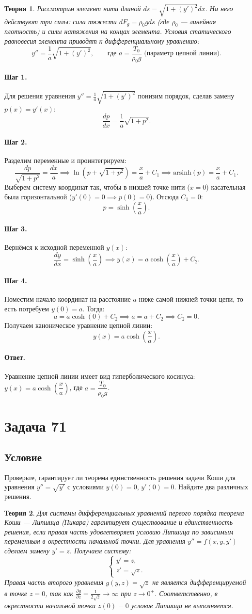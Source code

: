 \documentclass[12pt,a4paper]{article}
\theoremstyle{solution}
\newtheorem*{theory}{Теория}
\newcommand{\task}[1]{\newpage\section*{Задача #1}}
\newcommand{\answer}{\paragraph{Ответ.}}
\newcommand{\step}[1]{\paragraph{Шаг #1.}}
\begin{document}
\begin{theory}
Рассмотрим элемент нити длиной $ds = \sqrt{1 + (y')^2} dx$. На него действуют три силы: сила тяжести $dF_g = \rho_0 g ds$ (где $\rho_0$ — линейная плотность) и силы натяжения на концах элемента.
Условия статического равновесия элемента приводят к дифференциальному уравнению:
\[
y'' = \frac{1}{a} \sqrt{1 + (y')^2}, \qquad \text{где } a = \frac{T_0}{\rho_0 g} \text{ (параметр цепной линии)}.
\]
\end{theory}

\step{1} Для решения уравнения $y'' = \frac{1}{a} \sqrt{1 + (y')^2}$ понизим порядок, сделав замену $p(x) = y'(x)$:
\[
\frac{dp}{dx} = \frac{1}{a} \sqrt{1 + p^2}.
\]

\step{2} Разделим переменные и проинтегрируем:
\[
\frac{dp}{\sqrt{1 + p^2}} = \frac{dx}{a} \implies \ln\left(p + \sqrt{1 + p^2}\right) = \frac{x}{a} + C_1 \implies \mathrm{arsinh}(p) = \frac{x}{a} + C_1.
\]
Выберем систему координат так, чтобы в низшей точке нити ($x = 0$) касательная была горизонтальной ($y'(0) = 0 \implies p(0) = 0$). Отсюда $C_1 = 0$:
\[
p = \sinh\left(\frac{x}{a}\right).
\]

\step{3} Вернёмся к исходной переменной $y(x)$:
\[
\frac{dy}{dx} = \sinh\left(\frac{x}{a}\right) \implies y(x) = a \cosh\left(\frac{x}{a}\right) + C_2.
\]

\step{4} Поместим начало координат на расстояние $a$ ниже самой нижней точки цепи, то есть потребуем $y(0) = a$. Тогда:
\[
a = a \cosh(0) + C_2 \implies a = a + C_2 \implies C_2 = 0.
\]
Получаем каноническое уравнение цепной линии:
\[
y(x) = a \cosh\left(\frac{x}{a}\right).
\]

\answer
Уравнение цепной линии имеет вид гиперболического косинуса: $y(x) = a \cosh\left(\dfrac{x}{a}\right)$, где $a = \dfrac{T_0}{\rho_0 g}$.

\task{71}
\subsection*{Условие}
Проверьте, гарантирует ли теорема единственность решения задачи Коши для уравнения $y'' = \sqrt{y'}$ с условиями $y(0) = 0$, $y'(0) = 0$. Найдите два различных решения.

\begin{theory}
Для системы дифференциальных уравнений первого порядка теорема Коши — Липшица (Пикара) гарантирует существование и единственность решения, если правая часть удовлетворяет условию Липшица по зависимым переменным в окрестности начальной точки.
Для уравнения $y'' = f(x, y, y')$ сделаем замену $y' = z$. Получаем систему:
\[
\begin{cases}
y' = z, \\
z' = \sqrt{z}.
\end{cases}
\]
Правая часть второго уравнения $g(y, z) = \sqrt{z}$ не является дифференцируемой в точке $z = 0$, так как $\frac{\partial g}{\partial z} = \frac{1}{2\sqrt{z}} \to \infty$ при $z \to 0^+$. Соответственно, в окрестности начальной точки $z(0) = 0$ условие Липшица не выполняется.
\end{theory}
\end{document}
